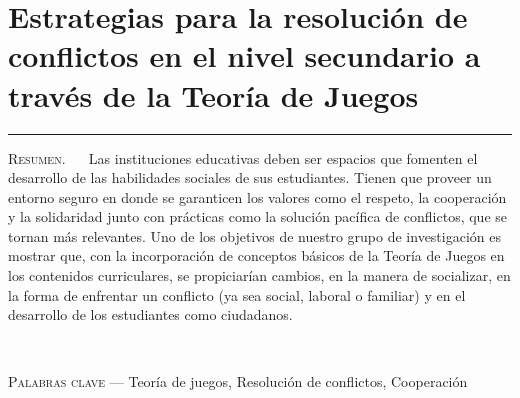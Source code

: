 \thispagestyle{portadapage}
\setcounter{subsection}{0}
\setcounter{subsubsection}{0}
\setcounter{actividad}{0}
\setcounter{actividad_previa}{0}
\setcounter{actividad_entre}{0}
\renewcommand{\articulotipo}{Comunicación breve}
\renewcommand{\articulotitulo}{Estrategias para la resolución de conflictos en el nivel secundario a través de la Teoría de Juegos}
\renewcommand{\articulotitulocorto}{Estrategias para la resolución de conflictos en el nivel secundario a través de la Teoría de Juegos}
\section{\articulotitulo}

\noindent\rule{\linewidth}{2pt}

\vspace{0.25cm}

\begin{flushright}
	\vspace{1em}
\end{flushright}

\vspace{0.5cm}

\begin{center}
	\begin{minipage}{0.75\linewidth} \small
		\textsc{Resumen}. ~
		 Las instituciones educativas deben ser espacios que fomenten el desarrollo de las habilidades sociales de sus estudiantes. Tienen que proveer un entorno seguro en donde se garanticen los valores como el respeto, la cooperación y la solidaridad junto con prácticas como la solución pacífica de conflictos, que se tornan más relevantes. Uno de los objetivos de nuestro grupo de investigación es mostrar que, con la incorporación de conceptos básicos de la Teoría de Juegos en los contenidos curriculares, se propiciarían cambios, en la manera de socializar, en la forma de enfrentar un conflicto (ya sea social, laboral o familiar) y en el desarrollo de los estudiantes como ciudadanos.
	\end{minipage}\\
	
	\vspace{0.5em}
	
	\begin{minipage}{0.75\linewidth} \small
	\textsc{Palabras clave} --- Teoría de juegos, Resolución de conflictos, Cooperación
	\end{minipage}
\end{center}


